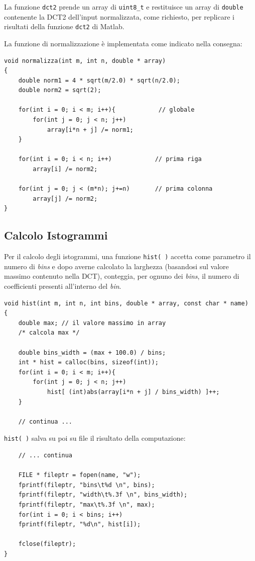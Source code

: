 \documentclass[11pt,a4paper]{scrartcl}
\begin{document}
La funzione \texttt{dct2} prende un array di \texttt{uint8\_t} e restituisce un array di \texttt{double} contenente la DCT2 dell'input normalizzata, come richiesto, per replicare i risultati della funzione \texttt{dct2} di Matlab.

La funzione di normalizzazione è implementata come indicato nella consegna:

\begin{verbatim}
void normalizza(int m, int n, double * array)
{
    double norm1 = 4 * sqrt(m/2.0) * sqrt(n/2.0);
    double norm2 = sqrt(2);
    
    for(int i = 0; i < m; i++){            // globale
        for(int j = 0; j < n; j++)
            array[i*n + j] /= norm1;     
    }

    for(int i = 0; i < n; i++)            // prima riga
        array[i] /= norm2;

    for(int j = 0; j < (m*n); j+=n)       // prima colonna
        array[j] /= norm2;
}
\end{verbatim}

\subsection*{Calcolo Istogrammi}
Per il calcolo degli istogrammi, una funzione \texttt{hist( )} accetta come parametro il numero di \emph{bins} e dopo averne calcolato la larghezza (basandosi sul valore massimo contenuto nella DCT), conteggia, per ognuno dei \emph{bins}, il numero di coefficienti presenti all'interno del \emph{bin}.

\begin{verbatim}
void hist(int m, int n, int bins, double * array, const char * name)
{
    double max; // il valore massimo in array
    /* calcola max */
   
    double bins_width = (max + 100.0) / bins;
    int * hist = calloc(bins, sizeof(int));
    for(int i = 0; i < m; i++){
        for(int j = 0; j < n; j++)
	        hist[ (int)abs(array[i*n + j] / bins_width) ]++;
    }

    // continua ...
\end{verbatim}

\texttt{hist( )} salva su poi su file il risultato della computazione:
\begin{verbatim}
    // ... continua
   
    FILE * fileptr = fopen(name, "w");
    fprintf(fileptr, "bins\t%d \n", bins);
    fprintf(fileptr, "width\t%.3f \n", bins_width);
    fprintf(fileptr, "max\t%.3f \n", max);
    for(int i = 0; i < bins; i++)
	fprintf(fileptr, "%d\n", hist[i]);

    fclose(fileptr);
}
\end{verbatim}
\end{document}
